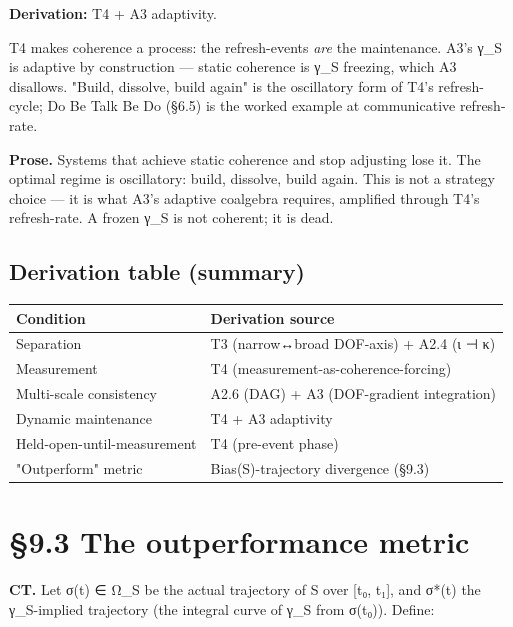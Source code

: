 \documentclass[11pt, openany]{book}
\newcommand{\sectionbreak}{\clearpage}
\begin{document}
\textbf{Derivation:} T4 + A3 adaptivity.

T4 makes coherence a process: the refresh-events \textit{are} the maintenance. A3's γ\_\allowbreak{}S is adaptive by construction --- static coherence is γ\_\allowbreak{}S freezing, which A3 disallows. "Build, dissolve, build again" is the oscillatory form of T4's refresh-cycle; Do Be Talk Be Do (§6.5) is the worked example at communicative refresh-rate.

\textbf{Prose.} Systems that achieve static coherence and stop adjusting lose it. The optimal regime is oscillatory: build, dissolve, build again. This is not a strategy choice --- it is what A3's adaptive coalgebra requires, amplified through T4's refresh-rate. A frozen γ\_\allowbreak{}S is not coherent; it is dead.

\subsection{Derivation table (summary)}

\begingroup\setlength{\tabcolsep}{3pt}\renewcommand{\arraystretch}{1.15}\footnotesize
\begin{center}
\begin{tabular}{p{1.72in} p{2.67in}}
\toprule
Condition & Derivation source \\
\midrule
Separation & T3 (narrow↔broad DOF-axis) + A2.4 (ι ⊣ κ) \\
Measurement & T4 (measurement-as-coherence-forcing) \\
Multi-scale consistency & A2.6 (DAG) + A3 (DOF-gradient integration) \\
Dynamic maintenance & T4 + A3 adaptivity \\
Held-open-until-measurement & T4 (pre-event phase) \\
"Outperform" metric & Bias(S)-trajectory divergence (§9.3) \\
\bottomrule
\end{tabular}
\end{center}
\endgroup
\sectionbreak

\section{§9.3 The outperformance metric}

\textbf{CT.} Let σ(t) ∈ Ω\_\allowbreak{}S be the actual trajectory of S over [t₀, t₁], and σ*(t) the γ\_\allowbreak{}S-implied trajectory (the integral curve of γ\_\allowbreak{}S from σ(t₀)). Define:
\end{document}
